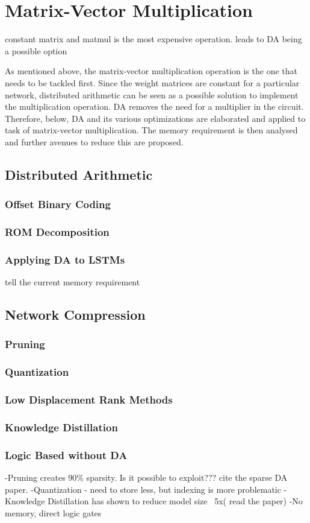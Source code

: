 \section{Matrix-Vector Multiplication}
constant matrix and matmul is the most expensive operation. leads to DA being a possible option

As mentioned above, the matrix-vector multiplication operation is the one that needs to be tackled first. Since the weight matrices are constant for a particular network, distributed arithmetic can be seen as a possible solution to implement the multiplication operation. DA removes the need for a multiplier in the circuit. Therefore, below, DA and its various optimizations are elaborated and applied to task of matrix-vector multiplication. The memory requirement is then analysed and further avenues to reduce this are proposed.
\subsection{Distributed Arithmetic}
\subsubsection{Offset Binary Coding}
\subsubsection{ROM Decomposition}
\subsubsection{Applying DA to LSTMs}
tell the current memory requirement
\subsection{Network Compression}
\subsubsection{Pruning}
\subsubsection{Quantization}
\subsubsection{Low Displacement Rank Methods}
\subsubsection{Knowledge Distillation}
\subsubsection{Logic Based without DA}

-Pruning creates 90\% sparsity. Is it possible to exploit??? cite the sparse DA paper.
-Quantization - need to store less, but indexing is more problematic
-Knowledge Distillation has shown to reduce model size ~5x( read the paper)
-No memory, direct logic gates
